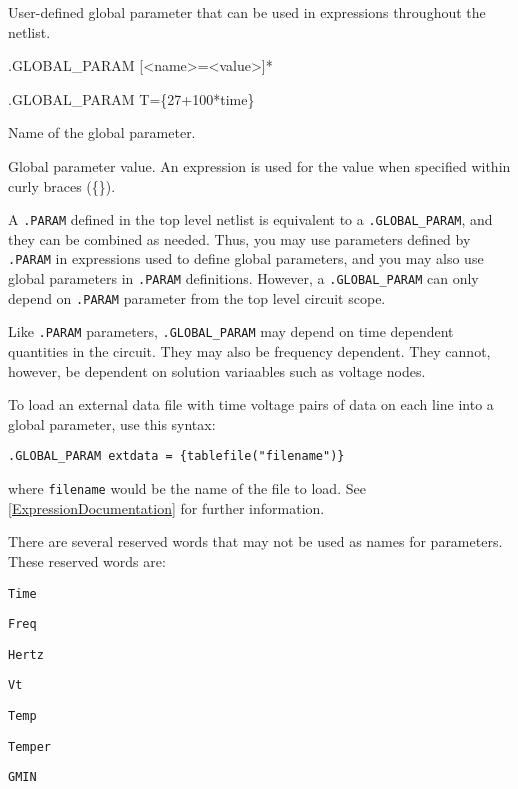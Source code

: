

User-defined global parameter that can be used in expressions throughout the netlist.
\begin{Command}

\format
.GLOBAL\_PARAM [<name>=<value>]*

\examples
.GLOBAL\_PARAM T=\{27+100*time\}

\begin{Arguments}
Name of the global parameter.

Global parameter value.  An expression is used for the value when specified within curly braces (\{\}).

\end{Arguments}

\comments

A \texttt{.PARAM} 
defined in the top level netlist is equivalent to 
a \texttt{.GLOBAL\_PARAM}, and they can be combined as needed.
Thus, you may use parameters defined by \texttt{.PARAM} in expressions used to
define global parameters, and you may also use global parameters in
\texttt{.PARAM} definitions.    However, a \texttt{.GLOBAL\_PARAM} 
  can only depend on \texttt{.PARAM} parameter from the top level circuit scope.

Like \texttt{.PARAM} parameters, \texttt{.GLOBAL\_PARAM} may
depend on time dependent quantities in the circuit.  They may also
be frequency dependent.  They cannot, however, be 
dependent on solution variaables such as voltage nodes.

To load an external data file with time voltage pairs of data on each 
line into a global parameter, use this syntax:

\texttt{.GLOBAL\_PARAM extdata = \{tablefile("filename")\}}

where \texttt{filename} would be the name of the file to load.  See \ref{ExpressionDocumentation} for 
further information.

There are several reserved words that may not be used as names for parameters.  These reserved words are:
\begin{XyceItemize}
\item \verb+Time+
\item \verb+Freq+ 
\item \verb+Hertz+ 
\item \verb+Vt+
\item \verb+Temp+
\item \verb+Temper+
\item \verb+GMIN+
\end{XyceItemize}


\end{Command}
